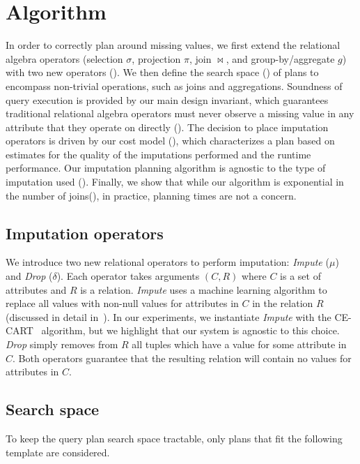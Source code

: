 \section{Algorithm}
In order to correctly plan around missing values, we first extend the relational algebra operators (selection $\sigma$, projection $\pi$, join $\bowtie$, and group-by/aggregate $g$) 
with two new operators (). We then define the search space () of plans to encompass non-trivial operations, such as joins and 
aggregations. Soundness of query execution is provided by our main design invariant, which guarantees traditional relational
algebra operators must never observe a missing value in any attribute that they operate on directly (). 
The decision to place imputation operators is driven by our cost model (), which characterizes a plan based on estimates for the 
quality of the imputations performed and the runtime performance. Our imputation planning algorithm is
agnostic to the type of imputation used (). Finally, we show
that while our algorithm is exponential in the number of joins(), in practice, planning times are not a concern.


\subsection{Imputation operators}
\label{sec:operators}
We introduce two new relational operators to perform imputation: \textit{Impute} ($\mu$) and
\textit{Drop} ($\delta$). Each operator takes arguments $(C, R)$ where $C$ is a set of
attributes and $R$ is a relation. \textit{Impute} uses a machine learning algorithm to
replace all \nullv{} values with non-null values for attributes in $C$ in the relation $R$ (discussed in detail in~).
In our experiments, we instantiate \textit{Impute} with the CE-CART~\cite{burgette2010multiple} algorithm, but we highlight that
our system is agnostic to this choice.
\textit{Drop} simply removes from $R$ all tuples which have a \nullv{} value for some attribute in $C$.
Both operators guarantee that the resulting relation will contain no \nullv{} values for
attributes in $C$.  

\subsection{Search space}
\label{sec:search-space}
To keep the query plan search space tractable, only plans that fit the following template are considered.

